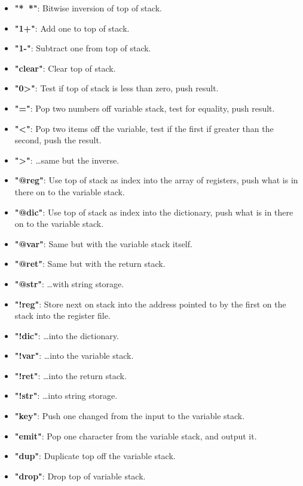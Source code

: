 \documentclass	[a4paper, 10pt]	{article}
\begin{document}
\begin{itemize}
        \item \textbf{"*~*"}: Bitwise inversion of top of stack.
        \item \textbf{"1+"}: Add one to top of stack.
        \item \textbf{"1-"}: Subtract one from top of stack.
        \item \textbf{"clear"}: Clear top of stack.
        \item \textbf{"0>"}: Test if top of stack is less than zero, push result.
        \item \textbf{"="}: Pop two numbers off variable stack, test for equality,
        push result.
        \item \textbf{"<"}: Pop two items off the variable, test if the first if
        greater than the second, push the result.
        \item \textbf{">"}: \ldots same but the inverse.
        \item \textbf{"@reg"}: Use top of stack as index into the array of
        registers, push what is in there on to the variable stack.
        \item \textbf{"@dic"}: Use top of stack as index into the dictionary,
        push what is in there on to the variable stack.
        \item \textbf{"@var"}: Same but with the variable stack itself.
        \item \textbf{"@ret"}: Same but with the return stack.
        \item \textbf{"@str"}: \ldots with string storage.
        \item \textbf{"!reg"}: Store next on stack into the address pointed
        to by the first on the stack into the register file.
        \item \textbf{"!dic"}: \ldots into the dictionary.
        \item \textbf{"!var"}: \ldots into the variable stack.
        \item \textbf{"!ret"}: \ldots into the return stack.
        \item \textbf{"!str"}: \ldots into string storage.
        \item \textbf{"key"}: Push one changed from the input to the
        variable stack.
        \item \textbf{"emit"}: Pop one character from the variable stack,
        and output it.
        \item \textbf{"dup"}: Duplicate top off the variable stack.
        \item \textbf{"drop"}: Drop top of variable stack.

\end{itemize}
\end{document}

